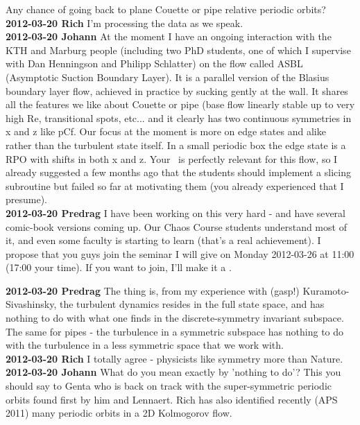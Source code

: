 \begin{description}
Any chance of going back to plane Couette or pipe relative periodic orbits?
\\
{\bf 2012-03-20 Rich }  I'm processing the data as we speak.
\\
{\bf 2012-03-20 Johann}
At the moment I have an ongoing interaction with the KTH and Marburg
people (including two PhD students, one of which I supervise with Dan
Henningson and Philipp Schlatter) on the flow called ASBL (Asymptotic
Suction Boundary Layer). It is a parallel version of the Blasius boundary
layer flow, achieved in practice by sucking gently at the wall. It shares
all the features we like about Couette or pipe (base flow linearly stable
up to very high Re, transitional spots, etc... and it clearly has two
continuous symmetries in x and z like pCf. Our focus at the moment is more
on edge states and alike rather than the turbulent state itself. In a
small periodic box the edge state is a RPO with shifts in both x and z.
Your \mslices\ is perfectly relevant for this flow, so I
already suggested a few months ago that the students should implement a
slicing subroutine but failed so far at motivating them (you already
experienced that I presume).
\\
{\bf 2012-03-20 Predrag}
I have been working on this very hard - and have several comic-book
versions coming up. Our
{Chaos Course} students understand most of it, and even some faculty is
starting to learn (that's a real achievement). I propose that you guys
join the
{seminar} I will give on Monday 2012-03-26 at 11:00 (17:00 your time). If
you want to join, I'll make it a
.


{\bf 2012-03-20 Predrag}
The thing is, from my experience with (gasp!) Kuramoto-Sivashinsky, the
turbulent dynamics resides in the full state space, and has
nothing to do with what one finds in the discrete-symmetry invariant
subspace. The same for pipes - the turbulence in a
symmetric subspace has nothing to do with the turbulence in a less
symmetric space that we work with.
\\
{\bf 2012-03-20 Rich } I totally agree - physicists like symmetry more
than Nature.
\\
{\bf 2012-03-20 Johann}
What do you mean exactly by 'nothing to do'? This you should say to Genta
who is back on track with the super-symmetric periodic orbits found first
by him and Lennaert. Rich has also identified recently (APS 2011) many
periodic orbits in a 2D Kolmogorov flow.



\end{description}
